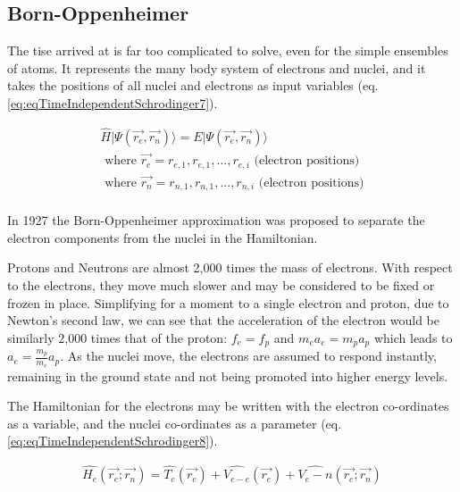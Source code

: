\subsection{Born-Oppenheimer}

The \acrshort{tise} arrived at is far too complicated to solve, even for the simple ensembles of atoms.  It represents the many body system of electrons and nuclei, and it takes the positions of all nuclei and electrons as input variables (eq. \ref{eq:eqTimeIndependentSchrodinger7}).

\begin{equation}
\begin{split}
\hat{H} \lvert \Psi (\vec{r_e}, \vec{r_n}) \rangle = E \lvert \Psi (\vec{r_e}, \vec{r_n}) \rangle \\
\text{ where } \vec{r_e} = r_{e,1}, r_{e,1},...,r_{e,i} \text{ (electron positions)} \\
\text{ where } \vec{r_n} = r_{n,1}, r_{n,1},...,r_{n,i} \text{ (electron positions)} \\
\end{split}
\label{eq:eqTimeIndependentSchrodinger7}
\end{equation}

In 1927 the Born-Oppenheimer approximation was proposed to separate the electron components from the nuclei in the Hamiltonian.  

Protons and Neutrons are almost 2,000 times the mass of electrons.  With respect to the electrons, they move much slower and may be considered to be fixed or frozen in place.  Simplifying for a moment to a single electron and proton, due to Newton's second law, we can see that the acceleration of the electron would be similarly 2,000 times that of the proton: $f_e = f_p$ and $m_e a_e = m_p a_p$ which leads to $a_e = \frac{m_p}{m_e} a_p$.  As the nuclei move, the electrons are assumed to respond instantly, remaining in the ground state and not being promoted into higher energy levels.

The Hamiltonian for the electrons may be written with the electron co-ordinates as a variable, and the nuclei co-ordinates as a parameter (eq. \ref{eq:eqTimeIndependentSchrodinger8}).

\begin{equation}
\begin{split}
\hat{H_e} (\vec{r_e}; \vec{r_n}) = \hat{T_e}(\vec{r_e}) + \hat{V_{e-e}}(\vec{r_e}) + \hat{V_e-n}(\vec{r_e}; \vec{r_n})
\end{split}
\label{eq:eqTimeIndependentSchrodinger8}
\end{equation}

